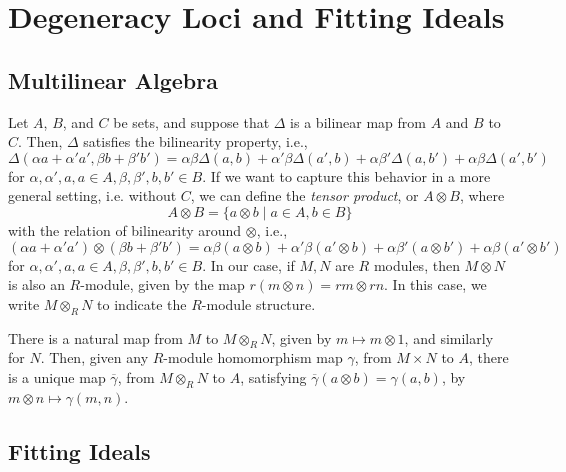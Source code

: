 \documentclass{amsart}
\theoremstyle{definition}
\theoremstyle{remark}
\numberwithin{equation}{section}
\begin{document}
\section{Degeneracy Loci and Fitting Ideals}

\subsection{Multilinear Algebra}

Let $A$, $B$, and $C$ be sets, and suppose that $\Delta$ is a bilinear map from $A$ and $B$ to $C$. Then, $\Delta$ satisfies the bilinearity property, i.e.,
\begin{equation*}
  \Delta(\alpha a + \alpha' a', \beta b + \beta' b') = \alpha \beta \Delta(a, b) + \alpha' \beta \Delta(a', b) + \alpha \beta' \Delta(a, b') + \alpha \beta \Delta(a', b')
\end{equation*}
for $\alpha, \alpha', a, a \in A, \beta, \beta', b, b' \in B$. If we want to capture this behavior in a more general setting, i.e. without $C$, we can define the \emph{tensor product}, or $A \otimes B$, where
\begin{equation*}
  A \otimes B = \{ a \otimes b \mid a \in A, b \in B \}
\end{equation*}
with the relation of bilinearity around $\otimes$, i.e.,
\begin{equation*}
  (\alpha a + \alpha' a') \otimes (\beta b + \beta' b') = \alpha \beta (a \otimes b) + \alpha' \beta (a' \otimes b) + \alpha \beta' (a \otimes b') + \alpha \beta (a' \otimes b')
\end{equation*}
for $\alpha, \alpha', a, a \in A, \beta, \beta', b, b' \in B$. In our case, if $M, N$ are $R$ modules, then $M \otimes N$ is also an $R$-module, given by the map $r (m \otimes n) = rm \otimes rn$. In this case, we write $M \otimes_R N$ to indicate the $R$-module structure.

There is a natural map from $M$ to $M \otimes_R N$, given by $m \mapsto m \otimes 1$, and similarly for $N$. Then, given any $R$-module homomorphism map $\gamma$, from $M \times N$ to $A$, there is a unique map $\overline{\gamma}$, from $M \otimes_R N$ to $A$, satisfying $\overline{\gamma}(a \otimes b) = \gamma(a, b)$, by $m \otimes n \mapsto \gamma(m, n)$.


\subsection{Fitting Ideals}
\end{document}
